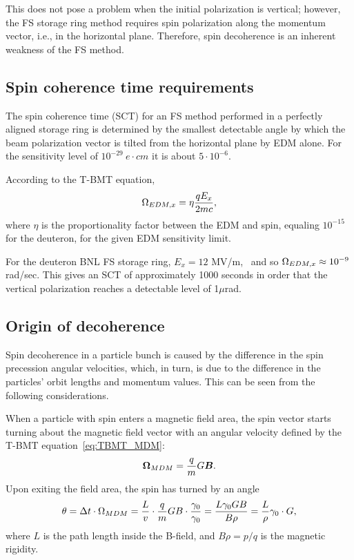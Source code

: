 \documentclass{article}
\begin{document}
This does not pose a problem when the initial polarization is vertical; however, the FS storage ring method requires spin polarization along the momentum vector, i.e., in the horizontal plane. Therefore, spin decoherence is an inherent weakness of the FS method.

\subsection{Spin coherence time requirements}
The spin coherence time (SCT) for an FS method performed in a perfectly aligned storage ring is determined by the smallest detectable angle by which the beam polarization vector is tilted from the horizontal plane by EDM alone. For the sensitivity level of $10^{-29}~e\cdot cm$ it is about $5\cdot10^{-6}$.~\cite{BNL:Deuteron2008}

According to the T-BMT equation,
\[
\Omega_{EDM,x} = \eta\frac{qE_x}{2mc},
\]
where $\eta$ is the proportionality factor between the EDM and spin, equaling $10^{-15}$ for the deuteron, for the given EDM sensitivity limit.~\citep[p.~206]{Eremey:Thesis}

For the deuteron BNL FS storage ring, $E_x = 12$ MV/m,~\citep[p.~19]{BNL:Deuteron2008} and so $\Omega_{EDM,x}\approx 10^{-9}$ rad/sec. This gives an SCT of approximately 1000 seconds in order that the vertical polarization reaches a detectable level of 1$\mu$rad.~\citep[p.~207]{Eremey:Thesis}

\subsection{Origin of decoherence}\label{sec:Decoh_origin}
Spin decoherence in a particle bunch is caused by the difference in the spin precession angular velocities, which, in turn, is due to the difference in the particles' orbit lengths and momentum values. This can be seen from the following considerations.

When a particle with spin enters a magnetic field area, the spin vector starts turning about the magnetic field vector with an angular velocity defined by the T-BMT equation~\eqref{eq:TBMT_MDM}:
\begin{equation*}
  \boldsymbol{\Omega}_{MDM} = \frac qm G\boldsymbol B.
\end{equation*}
Upon exiting the field area, the spin has turned by an angle
\begin{equation*}
  \theta = \Delta t\cdot\Omega_{MDM} = \frac Lv \cdot \frac qm GB\cdot \frac{\gamma_0}{\gamma_0} = \frac{L\gamma_0 GB}{B\rho} = \frac L\rho\gamma_0\cdot G,
\end{equation*}
where $L$ is the path length inside the B-field, and $B\rho = p/q$ is the magnetic rigidity.
\end{document}
